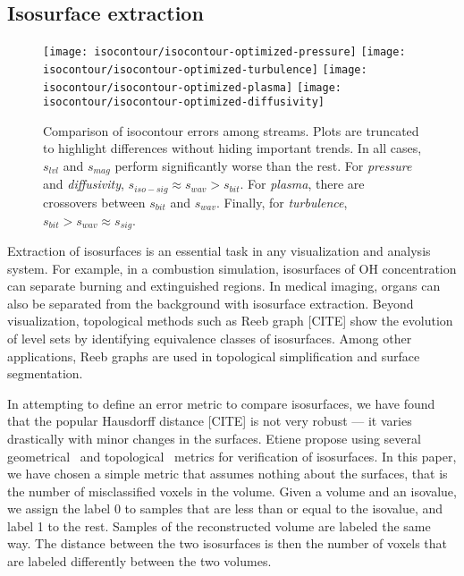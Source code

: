 \subsection{Isosurface extraction}\label{sec:isocontour}

\begin{figure}[h]
	\centering
	{\texttt{[image: isocontour/isocontour-optimized-pressure]}}
	{\texttt{[image: isocontour/isocontour-optimized-turbulence]}}
	{\texttt{[image: isocontour/isocontour-optimized-plasma]}}
	{\texttt{[image: isocontour/isocontour-optimized-diffusivity]}}
	\caption{Comparison of isocontour errors among streams. Plots are truncated to highlight
	differences without hiding important trends. In all cases, $s_{lvl}$ and $s_{mag}$ perform
	significantly worse than the rest. For \emph{pressure} and \emph{diffusivity}, $s_{iso-sig}
	\approx s_{wav} > s_{bit}$. For \emph{plasma}, there are crossovers between $s_{bit}$ and
	$s_{wav}$. Finally, for \emph{turbulence}, $s_{bit} > s_{wav}\approx
	s_{sig}$.}\label{fig:isocontour-plots}
\end{figure}

Extraction of isosurfaces is an essential task in any visualization and analysis system. For
example, in a combustion simulation, isosurfaces of OH concentration can separate burning and
extinguished regions. In medical imaging, organs can also be separated from the background with
isosurface extraction. Beyond visualization, topological methods such as Reeb graph [CITE] show the
evolution of level sets by identifying equivalence classes of isosurfaces. Among other applications,
Reeb graphs are used in topological simplification and surface segmentation.

In attempting to define an error metric to compare isosurfaces, we have found that the popular
Hausdorff distance [CITE] is not very robust --- it varies drastically with minor changes in the
surfaces. Etiene \etal propose using several geometrical~\cite{verifiable-isosurface} and
topological~\cite{topology-verification-isosurface} metrics for verification of isosurfaces. In this
paper, we have chosen a simple metric that assumes nothing about the surfaces, that is the number of
misclassified voxels in the volume. Given a volume and an isovalue, we assign the label 0 to samples
that are less than or equal to the isovalue, and label 1 to the rest. Samples of the reconstructed
volume are labeled the same way. The distance between the two isosurfaces is then the number of
voxels that are labeled differently between the two volumes.

